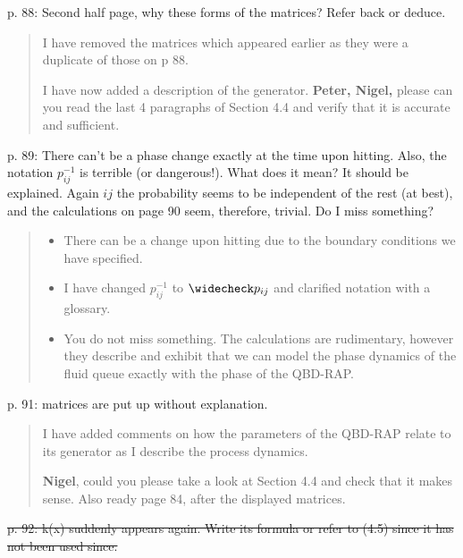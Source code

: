 \documentclass[a4paper]{article}
\begin{document}
p. 88: Second half page, why these forms of the matrices? Refer back or deduce.
\begin{quote}
    I have removed the matrices which appeared earlier as they were a duplicate of those on p 88. 

    I have now added a description of the generator. \textbf{Peter, Nigel,} please can you read the last 4 paragraphs of Section 4.4 and verify that it is accurate and sufficient.
\end{quote}

p. 89: There can't be a phase change exactly at the time upon hitting. Also, the notation \(p_{ij}^{-1}\) is terrible (or dangerous!). What does it mean? It should be explained. Again \(ij\)
the probability seems to be independent of the rest (at best), and the calculations on page 90 seem, therefore, trivial. Do I miss something?
\begin{quote}
    \begin{itemize}
        \item There can be a change upon hitting due to the boundary conditions we have specified. 
        \item I have changed \(p_{ij}^{-1}\) to \(\widecheck p_{ij}\) and clarified notation with a glossary. 
        \item You do not miss something. The calculations are rudimentary, however they describe and exhibit that we can model the phase dynamics of the fluid queue exactly with the phase of the QBD-RAP.
    \end{itemize}
\end{quote}

p. 91: matrices are put up without explanation.
\begin{quote}
    I have added comments on how the parameters of the QBD-RAP relate to its generator as I describe the process dynamics. 

    \textbf{Nigel}, could you please take a look at Section 4.4 and check that it makes sense. Also ready page 84, after the displayed matrices.
\end{quote}

\st{p. 92: k(x) suddenly appears again. Write its formula or refer to (4.5) since it has not been used since.}
\end{document}
